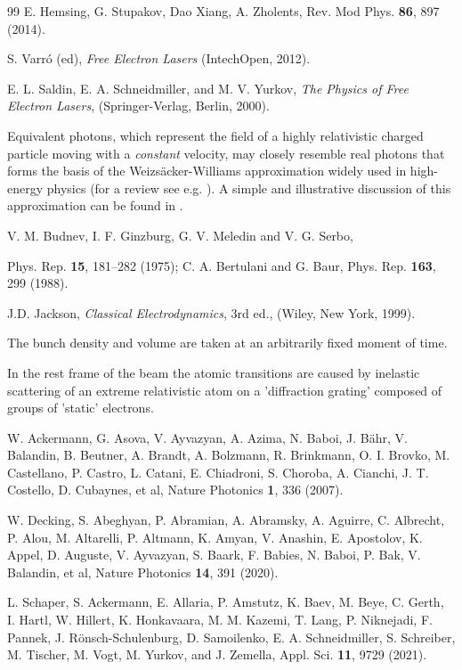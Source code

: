 \documentclass[prl, twocolumn, floatfix]{revtex4}
\begin{document}
\begin{thebibliography}{99}
E. Hemsing, G. Stupakov, Dao Xiang, A. Zholents,
Rev. Mod Phys. {\bf 86}, 897 (2014).

S. Varró (ed), {\it Free Electron Lasers} (IntechOpen, 2012).

 E. L. Saldin, E. A. Schneidmiller, and M. V. Yurkov,
{\it The Physics of Free Electron Lasers}, (Springer-Verlag, Berlin, 2000).

Equivalent photons, which represent the field of
a highly relativistic charged particle moving with
a {\it constant} velocity,
may closely resemble real photons that forms the basis
of the Weizs\"acker-Williams approximation widely
used in high-energy physics (for a review see  e.g. \cite{WWA}).
A simple and illustrative discussion of this approximation
can be found in \cite{jack}.

 V. M. Budnev, I. F. Ginzburg, G. V. Meledin and  V. G. Serbo,


Phys. Rep. {\bf 15}, 181–282 (1975);
C. A. Bertulani and G. Baur, Phys. Rep. {\bf 163}, 299 (1988).

 J.D. Jackson, {\it Classical Electrodynamics}, 3rd ed., (Wiley,
New York, 1999).

The bunch density and volume are taken at an arbitrarily fixed moment of time.

 In the rest frame of the beam the atomic transitions
are caused by inelastic scattering of an extreme relativistic atom
on a 'diffraction grating' composed  of groups of 'static' electrons.

 W. Ackermann, G. Asova, V. Ayvazyan, A. Azima, N. Baboi, J. B\"ahr,
 V. Balandin, B. Beutner, A. Brandt, A. Bolzmann, R. Brinkmann,
 O. I. Brovko, M. Castellano, P. Castro, L. Catani, E. Chiadroni,
S. Choroba, A. Cianchi, J. T. Costello, D. Cubaynes, et al,
Nature Photonics {\bf 1}, 336 (2007).

 W. Decking, S. Abeghyan, P. Abramian, A. Abramsky, A. Aguirre, C. Albrecht, P. Alou, M. Altarelli, P. Altmann, K. Amyan, V. Anashin, E. Apostolov, K. Appel, D. Auguste, V. Ayvazyan, S. Baark, F. Babies, N. Baboi, P. Bak, V. Balandin, et al,
Nature Photonics {\bf 14}, 391 (2020).

 L. Schaper, S. Ackermann, E. Allaria, P. Amstutz, K. Baev, M. Beye, C. Gerth, I. Hartl, W. Hillert, K. Honkavaara, M. M. Kazemi, T. Lang, P. Niknejadi, F. Pannek, J. R\"onsch-Schulenburg, D. Samoilenko,
E. A. Schneidmiller, S. Schreiber, M. Tischer, M. Vogt, M. Yurkov, and J. Zemella, Appl. Sci. {\bf 11}, 9729 (2021).


\end{thebibliography}
\end{document}
